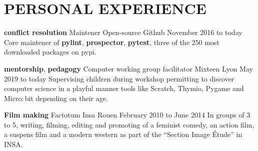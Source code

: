 \documentclass[11pt,a4paper]{moderncv}
\begin{document}




  \section{PERSONAL EXPERIENCE}\label{sec:personal-experience}

  \cventry
    {\textbf{conflict resolution}}
    {Maintener}
    {Open-source}
    {Github}
    {November 2016  to today}{
      Core maintener of \textbf{pylint}, \textbf{prospector}, \textbf{pytest},
      three of the 250 most downloaded packages on pypi.
    }

    \cventry
    {\textbf{mentorship}, \textbf{pedagogy}}
    {Computer working group facilitator}
    {Mixteen}
    {Lyon}
    {May 2019 to today}{
	  Supervising children during workshop permitting to discover computer science in a
	  playful manner tools like Scratch, Thymio, Pygame and Micro$:$bit depending on their age.
    }


    \cventry
    {\textbf{Film making}}
    {Factotum}
    {Insa}
    {Rouen}
    {February 2010 to June 2014}{
      In groups of 3 to 5, writing, filming, editing and promoting of a
      feminist comedy, an action film, a suspens film and a modern western as
      part of the ``Section Image Étude'' in INSA.
    }
\end{document}
